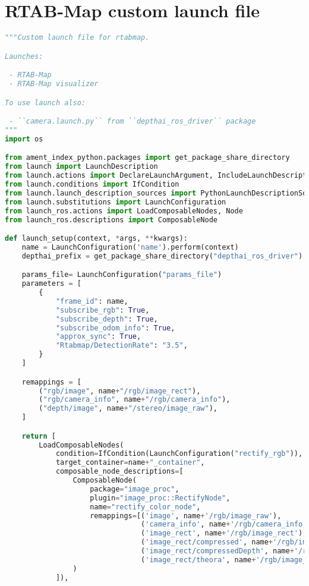 \section{RTAB-Map custom launch file} \label{rtabmap_custom_launch_file}
\begin{lstlisting}[language=python,frame=single]
"""Custom launch file for rtabmap.

Launches:

 - RTAB-Map
 - RTAB-Map visualizer

To use launch also:

 - ``camera.launch.py`` from ``depthai_ros_driver`` package
"""
import os

from ament_index_python.packages import get_package_share_directory
from launch import LaunchDescription
from launch.actions import DeclareLaunchArgument, IncludeLaunchDescription, OpaqueFunction
from launch.conditions import IfCondition
from launch.launch_description_sources import PythonLaunchDescriptionSource
from launch.substitutions import LaunchConfiguration
from launch_ros.actions import LoadComposableNodes, Node
from launch_ros.descriptions import ComposableNode

def launch_setup(context, *args, **kwargs):
    name = LaunchConfiguration('name').perform(context)
    depthai_prefix = get_package_share_directory("depthai_ros_driver")

    params_file= LaunchConfiguration("params_file")
    parameters = [
        {
            "frame_id": name,
            "subscribe_rgb": True,
            "subscribe_depth": True,
            "subscribe_odom_info": True,
            "approx_sync": True,
            "Rtabmap/DetectionRate": "3.5",
        }
    ]

    remappings = [
        ("rgb/image", name+"/rgb/image_rect"),
        ("rgb/camera_info", name+"/rgb/camera_info"),
        ("depth/image", name+"/stereo/image_raw"),
    ]

    return [
        LoadComposableNodes(
            condition=IfCondition(LaunchConfiguration("rectify_rgb")),
            target_container=name+"_container",
            composable_node_descriptions=[
                ComposableNode(
                    package="image_proc",
                    plugin="image_proc::RectifyNode",
                    name="rectify_color_node",
                    remappings=[('image', name+'/rgb/image_raw'),
                                ('camera_info', name+'/rgb/camera_info'),
                                ('image_rect', name+'/rgb/image_rect'),
                                ('image_rect/compressed', name+'/rgb/image_rect/compressed'),
                                ('image_rect/compressedDepth', name+'/rgb/image_rect/compressedDepth'),
                                ('image_rect/theora', name+'/rgb/image_rect/theora')]
                )
            ]),
        

\end{lstlisting}
